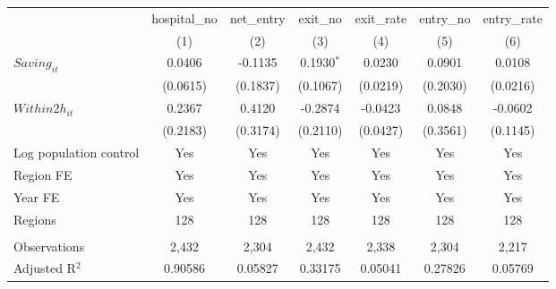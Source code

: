 \begingroup
\centering
\begin{tabular}{lcccccc}
   \toprule
                          & hospital\_no  & net\_entry  & exit\_no     & exit\_rate  & entry\_no  & entry\_rate \\    
                          & (1)           & (2)         & (3)          & (4)         & (5)        & (6)\\  
   \midrule 
   $Saving_{it}$          & 0.0406        & -0.1135     & 0.1930$^{*}$ & 0.0230      & 0.0901     & 0.0108\\   
                          & (0.0615)      & (0.1837)    & (0.1067)     & (0.0219)    & (0.2030)   & (0.0216)\\   
   $Within2h_{it}$        & 0.2367        & 0.4120      & -0.2874      & -0.0423     & 0.0848     & -0.0602\\   
                          & (0.2183)      & (0.3174)    & (0.2110)     & (0.0427)    & (0.3561)   & (0.1145)\\   
   Log population control & Yes           & Yes         & Yes          & Yes         & Yes        & Yes\\  
   Region FE              & Yes           & Yes         & Yes          & Yes         & Yes        & Yes\\  
   Year FE                & Yes           & Yes         & Yes          & Yes         & Yes        & Yes\\  
   Regions                & 128           & 128         & 128          & 128         & 128        & 128\\  
    \\
   Observations           & 2,432         & 2,304       & 2,432        & 2,338       & 2,304      & 2,217\\  
   Adjusted R$^2$         & 0.90586       & 0.05827     & 0.33175      & 0.05041     & 0.27826    & 0.05769\\  
   \bottomrule
\end{tabular}
\par\endgroup
